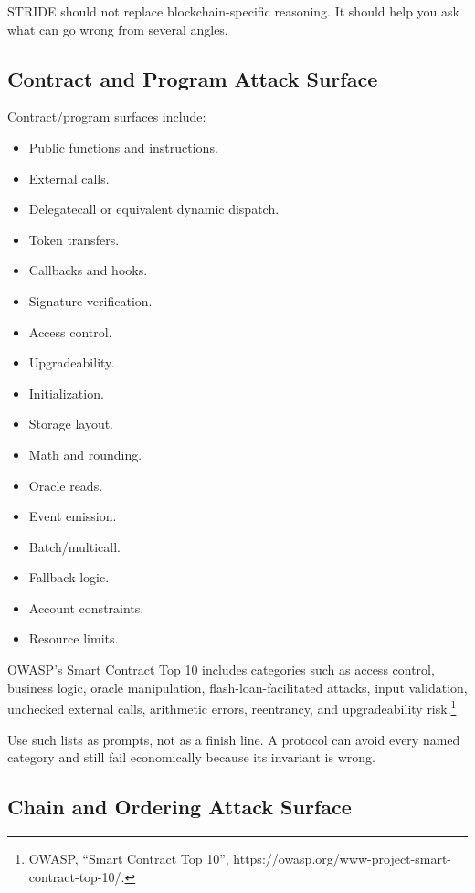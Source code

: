 STRIDE should not replace blockchain-specific reasoning. It should help
you ask what can go wrong from several angles.

\subsection{Contract and Program Attack Surface}

Contract/program surfaces include:

\begin{itemize}
\tightlist
\item
  Public functions and instructions.
\item
  External calls.
\item
  Delegatecall or equivalent dynamic dispatch.
\item
  Token transfers.
\item
  Callbacks and hooks.
\item
  Signature verification.
\item
  Access control.
\item
  Upgradeability.
\item
  Initialization.
\item
  Storage layout.
\item
  Math and rounding.
\item
  Oracle reads.
\item
  Event emission.
\item
  Batch/multicall.
\item
  Fallback logic.
\item
  Account constraints.
\item
  Resource limits.
\end{itemize}

OWASP's Smart Contract Top 10 includes categories such as access
control, business logic, oracle manipulation, flash-loan-facilitated
attacks, input validation, unchecked external calls, arithmetic errors,
reentrancy, and upgradeability risk.\footnote{OWASP, ``Smart Contract
  Top 10'', https://owasp.org/www-project-smart-contract-top-10/.}

Use such lists as prompts, not as a finish line. A protocol can avoid
every named category and still fail economically because its invariant
is wrong.

\subsection{Chain and Ordering Attack Surface}


